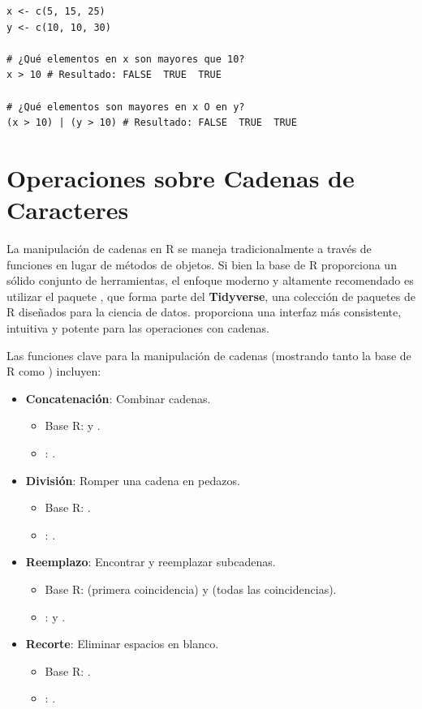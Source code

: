 \begin{example}
\text{ }\begin{verbatim}
x <- c(5, 15, 25)
y <- c(10, 10, 30)

# ¿Qué elementos en x son mayores que 10?
x > 10 # Resultado: FALSE  TRUE  TRUE

# ¿Qué elementos son mayores en x O en y?
(x > 10) | (y > 10) # Resultado: FALSE  TRUE  TRUE
\end{verbatim}
\end{example}

\section{Operaciones sobre Cadenas de Caracteres}
\label{sec:r_string_ops}
La manipulación de cadenas en R se maneja tradicionalmente a través de funciones en lugar de métodos de objetos. Si bien la base de R proporciona un sólido conjunto de herramientas, el enfoque moderno y altamente recomendado es utilizar el paquete \textbf{}, que forma parte del \textbf{Tidyverse}, una colección de paquetes de R diseñados para la ciencia de datos.  proporciona una interfaz más consistente, intuitiva y potente para las operaciones con cadenas.

Las funciones clave para la manipulación de cadenas (mostrando tanto la base de R como ) incluyen:
\begin{itemize}
    \item \textbf{Concatenación}: Combinar cadenas.
        \begin{itemize}
            \item Base R:  y .
            \item {}: .
        \end{itemize}
    \item \textbf{División}: Romper una cadena en pedazos.
        \begin{itemize}
            \item Base R: .
            \item {}: .
        \end{itemize}
    \item \textbf{Reemplazo}: Encontrar y reemplazar subcadenas.
        \begin{itemize}
            \item Base R:  (primera coincidencia) y  (todas las coincidencias).
            \item {}:  y .
        \end{itemize}
    \item \textbf{Recorte}: Eliminar espacios en blanco.
        \begin{itemize}
            \item Base R: .
            \item {}: .
        \end{itemize}
\end{itemize}

